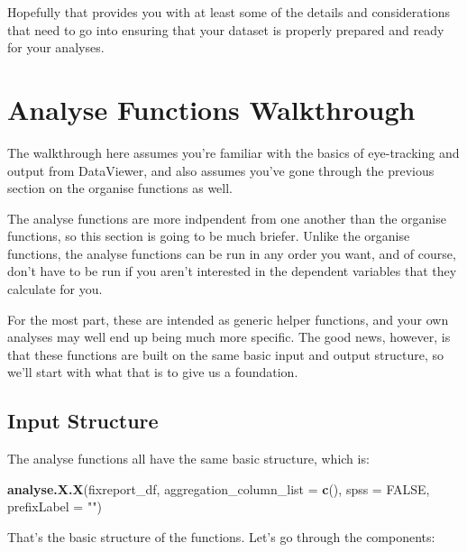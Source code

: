 \documentclass[]{book}
\newenvironment{Shaded}{\begin{snugshade}}{\end{snugshade}}
\newcommand{\DataTypeTok}[1]{\textcolor[rgb]{0.13,0.29,0.53}{#1}}
\newcommand{\KeywordTok}[1]{\textcolor[rgb]{0.13,0.29,0.53}{\textbf{#1}}}
\newcommand{\NormalTok}[1]{#1}
\newcommand{\OtherTok}[1]{\textcolor[rgb]{0.56,0.35,0.01}{#1}}
\newcommand{\StringTok}[1]{\textcolor[rgb]{0.31,0.60,0.02}{#1}}
\begin{document}
Hopefully that provides you with at least some of the details and considerations that need to go into ensuring that your dataset is properly prepared and ready for your analyses.

\hypertarget{analyseWakthrough}{%
\chapter{Analyse Functions Walkthrough}\label{analyseWakthrough}}

The walkthrough here assumes you're familiar with the basics of eye-tracking and output from DataViewer, and also assumes you've gone through the previous section on the organise functions as well.

The analyse functions are more indpendent from one another than the organise functions, so this section is going to be much briefer. Unlike the organise functions, the analyse functions can be run in any order you want, and of course, don't have to be run if you aren't interested in the dependent variables that they calculate for you.

For the most part, these are intended as generic helper functions, and your own analyses may well end up being much more specific. The good news, however, is that these functions are built on the same basic input and output structure, so we'll start with what that is to give us a foundation.

\hypertarget{input-structure}{%
\section{Input Structure}\label{input-structure}}

The analyse functions all have the same basic structure, which is:

\begin{Shaded}
\begin{Highlighting}[]
\KeywordTok{analyse.X.X}\NormalTok{(fixreport_df, }
            \DataTypeTok{aggregation_column_list =} \KeywordTok{c}\NormalTok{(),}
            \DataTypeTok{spss =} \OtherTok{FALSE}\NormalTok{, }
            \DataTypeTok{prefixLabel =} \StringTok{""}\NormalTok{)}
\end{Highlighting}
\end{Shaded}

That's the basic structure of the functions. Let's go through the components:
\end{document}
